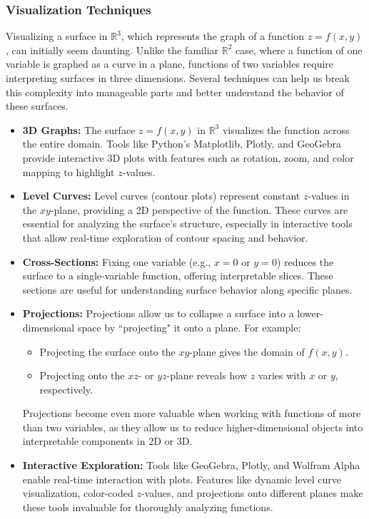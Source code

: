 \subsubsection*{Visualization Techniques}

\noindent Visualizing a surface in \( \mathbb{R}^3 \), which represents the graph of a function \( z = f(x, y) \), can initially seem daunting. Unlike the familiar \( \mathbb{R}^2 \) case, where a function of one variable is graphed as a curve in a plane, functions of two variables require interpreting surfaces in three dimensions. Several techniques can help us break this complexity into manageable parts and better understand the behavior of these surfaces.

\begin{itemize}
    \item \textbf{3D Graphs:} The surface \( z = f(x, y) \) in \( \mathbb{R}^3 \) visualizes the function across the entire domain. Tools like Python's Matplotlib, Plotly, and GeoGebra provide interactive 3D plots with features such as rotation, zoom, and color mapping to highlight \( z \)-values.

    \item \textbf{Level Curves:} Level curves (contour plots) represent constant \( z \)-values in the \( xy \)-plane, providing a 2D perspective of the function. These curves are essential for analyzing the surface's structure, especially in interactive tools that allow real-time exploration of contour spacing and behavior.

    \item \textbf{Cross-Sections:} Fixing one variable (e.g., \( x = 0 \) or \( y = 0 \)) reduces the surface to a single-variable function, offering interpretable slices. These sections are useful for understanding surface behavior along specific planes.

    \item \textbf{Projections:} Projections allow us to collapse a surface into a lower-dimensional space by ``projecting" it onto a plane. For example:
    \begin{itemize}
        \item Projecting the surface onto the \( xy \)-plane gives the domain of \( f(x, y) \).
        \item Projecting onto the \( xz \)- or \( yz \)-plane reveals how \( z \) varies with \( x \) or \( y \), respectively.
    \end{itemize}
    Projections become even more valuable when working with functions of more than two variables, as they allow us to reduce higher-dimensional objects into interpretable components in 2D or 3D.

    \item \textbf{Interactive Exploration:} Tools like GeoGebra, Plotly, and Wolfram Alpha enable real-time interaction with plots. Features like dynamic level curve visualization, color-coded \( z \)-values, and projections onto different planes make these tools invaluable for thoroughly analyzing functions.
\end{itemize}


